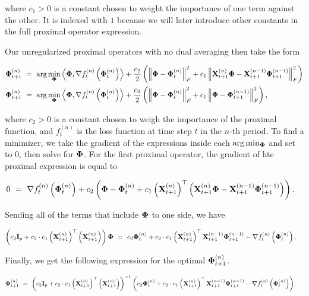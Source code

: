 \documentclass{article}
\begin{document}
	\noindent where $c_1 > 0$ is a constant chosen to weight the importance of one term against the other. It is indexed with $1$ because we will later introduce other constants in the full proximal operator expression.
	
	Our unregularized proximal operators with no dual averaging then take the form
	
	\begin{align}
		\mathbf{\Phi}_{t+1}^{(n)}\ &=\ \textnormal{arg} \min_{\mathbf{\Phi}} \left \langle \mathbf{\Phi}, \nabla f_t^{(n)} \left( \mathbf{\Phi}_t^{(n)} \right) \right \rangle + \frac{c_2}{2} \left( \left\lVert\mathbf{\Phi} - \mathbf{\Phi}_t^{(n)}\right\rVert_F^2 + c_1 \left\lVert\mathbf{X}_{t+1}^{(n)}\mathbf{\Phi} - \mathbf{X}_{t+1}^{(n-1)}\mathbf{\Phi}_{t+1}^{(n-1)}\right\rVert_F^2 \right)\\ 
		\mathbf{\Phi}_{t+1}^{(n)}\ &=\ \textnormal{arg} \min_{\mathbf{\Phi}} \left \langle \mathbf{\Phi}, \nabla f_t^{(n)} \left( \mathbf{\Phi}_t^{(n)} \right) \right \rangle + \frac{c_2}{2} \left( \left\lVert\mathbf{\Phi} - \mathbf{\Phi}_t^{(n)}\right\rVert_F^2 + c_1 \left\lVert\mathbf{\Phi} - \mathbf{\Phi}_{t+1}^{(n-1)}\right\rVert_F^2 \right) \textnormal{,}
	\end{align}
	
	\noindent where $c_2 > 0$ is a constant chosen to weigh the importance of the proximal function, and $f_t^{(n)}$ is the loss function at time step $t$ in the $n$-th period. To find a minimizer, we take the gradient of the expressions inside each $\textnormal{arg} \min_{\mathbf{\Phi}}$ and set to $0$, then solve for $\mathbf{\Phi}$. For the first proximal operator, the gradient of hte proximal expression is equal to
	
	\begin{align}
		0\ &=\ \nabla f_t^{(n)} \left( \mathbf{\Phi}_t^{(n)} \right) + c_2 \left( \mathbf{\Phi} - \mathbf{\Phi}_t^{(n)} + c_1 \left( \mathbf{X}_{t+1}^{(n)} \right)^{\top} \left( \mathbf{X}_{t+1}^{(n)} \mathbf{\Phi} - \mathbf{X}_{t+1}^{(n-1)}\mathbf{\Phi}_{t+1}^{(n-1)} \right) \right) \textnormal{.}
	\end{align}

	\noindent Sending all of the terms that include $\mathbf{\Phi}$ to one side, we have
	
	\begin{align}
		\left( c_2 \mathbf{I}_p + c_2 \cdot c_1 \left( \mathbf{X}_{t+1}^{(n)} \right)^{\top} \left( \mathbf{X}_{t+1}^{(n)} \right) \right) \mathbf{\Phi}\ &=\ c_2 \mathbf{\Phi}_t^{(n)} + c_2 \cdot c_1\left( \mathbf{X}_{t+1}^{(n)} \right)^{\top} \mathbf{X}_{t+1}^{(n-1)} \mathbf{\Phi}_{t+1}^{(n-1)} - \nabla f_t^{(n)} \left( \mathbf{\Phi}_t^{(n)} \right) \textnormal{.}
	\end{align}
	
	\noindent Finally, we get the following expression for the optimal $\mathbf{\Phi}_{t+1}^{(n)}$.
	
	\begin{align}
		\mathbf{\Phi}_{t+1}^{(n)}\ &=\ \left( c_2 \mathbf{I}_p + c_2 \cdot c_1 \left( \mathbf{X}_{t+1}^{(n)} \right)^{\top} \left( \mathbf{X}_{t+1}^{(n)} \right) \right)^{-1} \left( c_2 \mathbf{\Phi}_t^{(n)} + c_2 \cdot c_1 \left( \mathbf{X}_{t+1}^{(n)} \right)^{\top} \mathbf{X}_{t+1}^{(n-1)} \mathbf{\Phi}_{t+1}^{(n-1)} - \nabla f_t^{(n)} \left( \mathbf{\Phi}_t^{(n)} \right) \right) \textnormal{.}
	\end{align}
	
\end{document}

